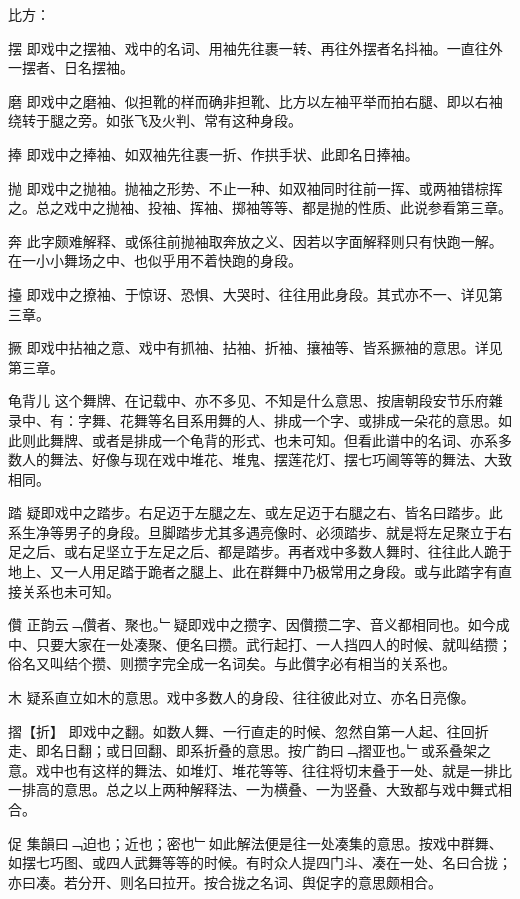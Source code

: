 比方：

\quad 摆
\quad 
即戏中之摆袖、戏中的名词、用袖先往裹一转、再往外摆者名抖袖。一直往外一摆者、日名摆袖。

\quad 磨
\quad 
即戏中之磨袖、似担靴的样而确非担靴、比方以左袖平举而拍右腿、即以右袖绕转于腿之旁。如张飞及火判、常有这种身段。

\quad 捧 
\quad 
即戏中之捧袖、如双袖先往裹一折、作拱手状、此即名日捧袖。

\quad 抛
\quad 
即戏中之抛袖。抛袖之形势、不止一种、如双袖同时往前一挥、或两袖错棕挥之。总之戏中之抛袖、投袖、挥袖、掷袖等等、都是抛的性质、此说参看第三章。

\quad 奔 
\quad 
此字颇难解释、或係往前抛袖取奔放之义、因若以字面解释则只有快跑一解。在一小小舞场之中、也似乎用不着快跑的身段。

\quad 擡
\quad 
即戏中之撩袖、于惊讶、恐惧、大哭时、往往用此身段。其式亦不一、详见第三章。

\quad 撅
\quad 
即戏中拈袖之意、戏中有抓袖、拈袖、折袖、攘袖等、皆系撅袖的意思。详见第三章。

\quad 龟背儿
\quad 
这个舞牌、在记载中、亦不多见、不知是什么意思、按唐朝段安节乐府雜录中、有：字舞、花舞等名目系用舞的人、排成一个字、或排成一朵花的意思。如此则此舞牌、或者是排成一个龟背的形式、也未可知。但看此谱中的名词、亦系多数人的舞法、好像与现在戏中堆花、堆鬼、摆莲花灯、摆七巧阃等等的舞法、大致相同。

\quad 踏
\quad 
疑即戏中之踏步。右足迈于左腿之左、或左足迈于右腿之右、皆名曰踏步。此系生净等男子的身段。旦脚踏步尤其多遇亮像时、必须踏步、就是将左足聚立于右足之后、或右足坚立于左足之后、都是踏步。再者戏中多数人舞时、往往此人跪于地上、又一人用足踏于跪者之腿上、此在群舞中乃极常用之身段。或与此踏字有直接关系也未可知。

\quad 儹
\quad 
正韵云﹁儹者、聚也。﹂疑即戏中之攒字、因儹攒二字、音义都相同也。如今成中、只要大家在一处凑聚、便名曰攒。武行起打、一人挡四人的时候、就叫结攒；俗名又叫结个攒、则攒字完全成一名词矣。与此儹字必有相当的关系也。

\quad 木
\quad 
疑系直立如木的意思。戏中多数人的身段、往往彼此对立、亦名日亮像。

\quad 摺【折】
\quad 
即戏中之翻。如数人舞、一行直走的时候、忽然自第一人起、往回折走、即名日翻；或日回翻、即系折叠的意思。按广韵曰﹁摺亚也。﹂或系叠架之意。戏中也有这样的舞法、如堆灯、堆花等等、往往将切末叠于一处、就是一排比一排高的意思。总之以上两种解释法、一为横叠、一为竖叠、大致都与戏中舞式相合。

\quad 促
\quad 
集韻曰﹁迫也；近也；密也﹂如此解法便是往一处凑集的意思。按戏中群舞、如摆七巧图、或四人武舞等等的时候。有时众人提四门斗、凑在一处、名曰合拢；亦曰凑。若分开、则名曰拉开。按合拢之名词、舆促字的意思颇相合。

